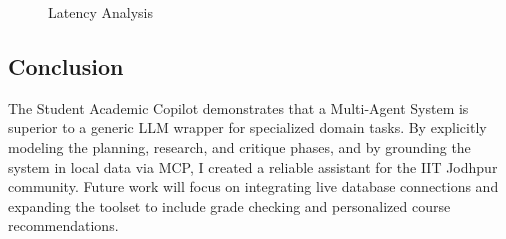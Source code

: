 \begin{figure}[H]
    \centering
    \caption{Latency Analysis}
    \label{fig:latency}
\end{figure}

\subsection{Conclusion}
The Student Academic Copilot demonstrates that a Multi-Agent System is superior to a generic LLM wrapper for specialized domain tasks. By explicitly modeling the planning, research, and critique phases, and by grounding the system in local data via MCP, I created a reliable assistant for the IIT Jodhpur community. Future work will focus on integrating live database connections and expanding the toolset to include grade checking and personalized course recommendations.